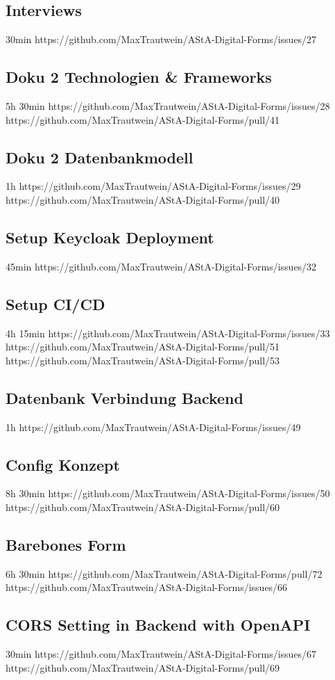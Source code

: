 \subsection{Interviews}
30min
https://github.com/MaxTrautwein/AStA-Digital-Forms/issues/27

\subsection{Doku 2 Technologien & Frameworks}
5h 30min
https://github.com/MaxTrautwein/AStA-Digital-Forms/issues/28
https://github.com/MaxTrautwein/AStA-Digital-Forms/pull/41
\subsection{Doku 2 Datenbankmodell}
1h
https://github.com/MaxTrautwein/AStA-Digital-Forms/issues/29
https://github.com/MaxTrautwein/AStA-Digital-Forms/pull/40
\subsection{Setup Keycloak Deployment}
45min
https://github.com/MaxTrautwein/AStA-Digital-Forms/issues/32
\subsection{Setup CI/CD}
4h 15min
https://github.com/MaxTrautwein/AStA-Digital-Forms/issues/33
https://github.com/MaxTrautwein/AStA-Digital-Forms/pull/51
https://github.com/MaxTrautwein/AStA-Digital-Forms/pull/53
\subsection{Datenbank Verbindung Backend}
1h
https://github.com/MaxTrautwein/AStA-Digital-Forms/issues/49

\subsection{Config Konzept}
8h 30min
https://github.com/MaxTrautwein/AStA-Digital-Forms/issues/50
https://github.com/MaxTrautwein/AStA-Digital-Forms/pull/60
\subsection{Barebones Form}
6h 30min
https://github.com/MaxTrautwein/AStA-Digital-Forms/pull/72
https://github.com/MaxTrautwein/AStA-Digital-Forms/issues/66
\subsection{CORS Setting in Backend with OpenAPI}
30min
https://github.com/MaxTrautwein/AStA-Digital-Forms/issues/67
https://github.com/MaxTrautwein/AStA-Digital-Forms/pull/69
